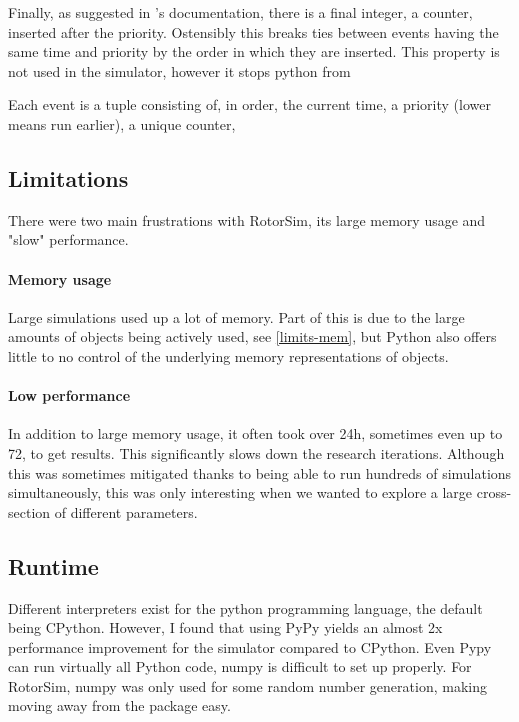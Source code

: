 Finally, as suggested in 's documentation, there is a final integer, a counter, inserted after the priority. Ostensibly this breaks ties between events having the same time and priority by the order in which they are inserted.
This property is not used in the simulator, however it stops python from 

Each event is a tuple consisting of, in order, the current time, a priority (lower means run earlier), a unique counter, 



\subsection{Limitations} \label{rotorsim-limits}

There were two main frustrations with RotorSim, its large memory usage and "slow" performance.

\paragraph{Memory usage} \label{rotorsim-mem}
Large simulations used up a lot of memory.
Part of this is due to the large amounts of objects being actively used, see \ref{limits-mem}, but Python also offers little to no control of the underlying memory representations of objects.

\paragraph{Low performance} \label{rotorsim-perf}
In addition to large memory usage, it often took over 24h, sometimes even up to 72, to get results.
This significantly slows down the research iterations.
Although this was sometimes mitigated thanks to being able to run hundreds of simulations simultaneously, this was only interesting when we wanted to explore a large cross-section of different parameters.



\subsection{Runtime} \label{rotorsim-runtime}

Different interpreters exist for the python programming language, the default being CPython.
However, I found that using PyPy \cite{team_pypy_2019} yields an almost 2x performance improvement for the simulator compared to CPython.
Even Pypy can run virtually all Python code, numpy \cite{van_der_walt_numpy_2011} is difficult to set up properly.
For RotorSim, numpy was only used for some random number generation, making moving away from the package easy.









